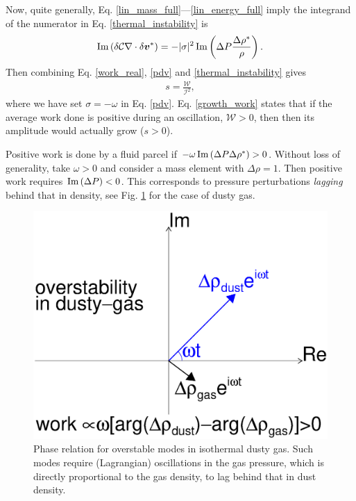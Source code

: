 Now, quite generally, Eq. \ref{lin_mass_full}---\ref{lin_energy_full} 
imply the integrand of the numerator in Eq. \ref{thermal_instability} 
is 
\begin{align} 
  \operatorname{Im} \left(\delta \mathcal{C}
  \nabla\cdot\delta \bm{v}^*\right) = 
  -|\sigma|^2\operatorname{Im} \left(\Delta P 
  \frac{\Delta\rho^*}{\rho}\right). \label{pdv}
\end{align}
Then combining Eq. \ref{work_real}, \ref{pdv} and
\ref{thermal_instability} 
gives  
\begin{align}
s = \frac{\mathcal{W}}{\mathcal{I}^2}, \label{growth_work}
\end{align}
where we have set $\sigma= - \omega$ in 
Eq. \ref{pdv}. Eq. \ref{growth_work} states that if the average work
done is positive during an oscillation, $\mathcal{W}>0$, then 
then its amplitude would actually grow ($s>0$).  %

Positive work is done by a fluid parcel if $-\omega \operatorname{Im}\left(\Delta  
P\Delta\rho^*\right)>0$. Without loss of generality, take $\omega>0$
and consider a mass element with $\Delta\rho = 1$. Then positive work 
requires $\operatorname{Im}\left(\Delta
P\right)<0$.  This corresponds to pressure perturbations \emph{lagging}
behind that in density, see Fig. \ref{lag_cartoon}
for the case of dusty gas.   



\begin{figure}
  \includegraphics[width=\linewidth,clip=true,trim=0cm 5cm 0cm 0cm]{figures/lag}
  \caption{Phase relation for overstable modes in isothermal dusty
    gas. Such modes require (Lagrangian) oscillations in the gas
    pressure, which is directly proportional to the gas density, to
    lag behind that in dust density. 
    \label{lag_cartoon}
  }
\end{figure}


